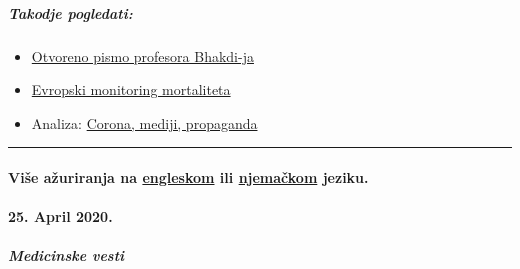 \hypertarget{takodje-pogledati}{%
\subparagraph{\texorpdfstring{\textbf{Takodje
pogledati:}}{Takodje pogledati:}}\label{takodje-pogledati}}

\begin{itemize}
\tightlist
\item
  \href{https://swprs.org/offener-brief-von-professor-sucharit-bhakdi-an-bundeskanzlerin-dr-angela-merkel/}{Otvoreno
  pismo profesora Bhakdi-ja}
\item
  \href{https://www.euromomo.eu/}{Evropski monitoring mortaliteta}
\item
  Analiza: \href{https://swprs.org/corona-medien-propaganda/}{Corona,
  mediji, propaganda}
\end{itemize}

\begin{center}\rule{0.5\linewidth}{\linethickness}\end{center}

\hypertarget{viux161e-aux17euriranja-na-engleskom-ili-njemaux10dkom-jeziku}{%
\paragraph{\texorpdfstring{Više ažuriranja na
\href{https://swprs.org/a-swiss-doctor-on-covid-19/}{engleskom} ili
\href{https://swprs.org/covid-19-hinweis-ii/}{njemačkom}
jeziku.}{Više ažuriranja na engleskom ili njemačkom jeziku.}}\label{viux161e-aux17euriranja-na-engleskom-ili-njemaux10dkom-jeziku}}

\hypertarget{25-april-2020}{%
\paragraph{25. April 2020.}\label{25-april-2020}}

\hypertarget{medicinske-vesti}{%
\subparagraph{\texorpdfstring{\textbf{Medicinske
vesti}}{Medicinske vesti}}\label{medicinske-vesti}}

